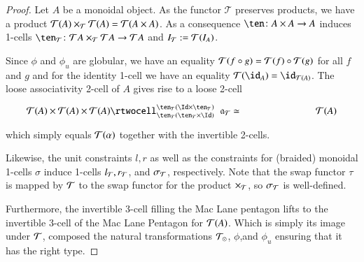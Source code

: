  \begin{proof}
Let $A$ be a monoidal object. As the functor $\mathcal{T}$ preserves products, we have a product $\mathcal{T}(A) \times_{\mathcal{T}} \mathcal{T}(A) = \mathcal{T}(A \times A)$. As a consequence $\ten\maps
  A\times A\to A$ induces 1-cells $\ten_{\mathcal{T}} \maps
 \mathcal{T}A\times_{\cT} \mathcal{T} A\to\mathcal{T}A$ and $I_{\mathcal{T}}:= \mathcal{T}(I_A)$. 
 
Since $\phi$ and $\phi_u$ are globular, we have an equality $\mathcal{T}(f \circ g) = \mathcal{T}(f) \circ \mathcal{T}(g)$ for all $f$ and $g$ and for the identity 1-cell we have an equality $\cT(\transid_A) = \transid_{\cT(A)}$. The loose associativity 2-cell of $A$ gives rise to a loose 2-cell
  \[\vcenter{\xymatrix@C=6pc{\cT(A)\times\cT(A)\times\cT(A) \rtwocell^{\ten_{\cT}
        (\Id\times\ten_{\cT})}_{\ten_{\cT}(\ten_{\cT}\times\Id)}{\hspace{.2cm}\fa_{\cT}\eqv} &\cT(A) }}\]
  which simply equals $\mathcal{T}(\alpha)$ together with the invertible 2-cells.
  
  Likewise, the unit constraints $l, r$ as well as the constraints for (braided) monoidal 1-cells $\sigma$ induce 1-cells $l_{\mathcal{T}}, r_{\mathcal{T}}$, and $\sigma_{\mathcal{T}}$, respectively. Note that the swap functor $\tau$ is mapped by $\mathcal{T}$ to the swap functor for the product $\times_{\mathcal{T}}$, so $\sigma_{\mathcal{T}}$ is well-defined.
  
 Furthermore, the invertible 3-cell filling the Mac Lane pentagon lifts to the invertible 3-cell of the Mac Lane Pentagon for $\mathcal{T}(A)$. Which is simply its image under $\mathcal{T}$, composed the natural transformations $\mathcal{T}_{\odot}$, $\phi$,and $\phi_u$ ensuring that it has the right type.
  

\end{proof}
